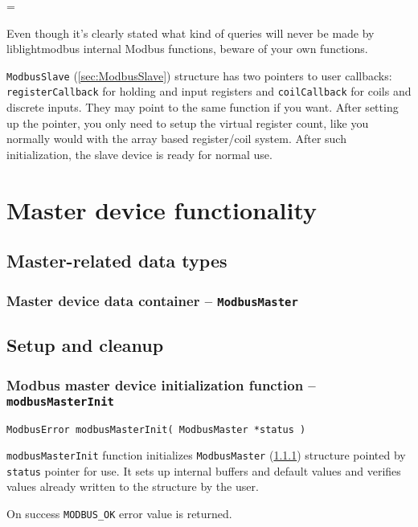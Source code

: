 \documentclass[11pt,a4paper]{article}
\newenvironment{warning}
{
	\par\begin{mdframed}[linewidth=0.5pt,linecolor=black]%
	\begin{list}{}{\leftmargin=1cm
	\labelwidth=\leftmargin}\item[\Large\ding{43}]
}
{	
	\end{list}\end{mdframed}\par
}
\newcommand{\coderef}[1]{\texttt{{#1}} (\ref{sec:#1})}
\newcommand{\warnbox}[1]{\vspace{0.2cm}\begin{warning}{#1}\end{warning}\vspace{0.2cm}}
\begin{document}
\warnbox{Even though it's clearly stated what kind of queries will never be made by liblightmodbus internal Modbus functions, beware of your own functions. }

\coderef{ModbusSlave} structure has two pointers to user callbacks: \texttt{registerCallback} for holding and input registers and \texttt{coilCallback} for coils and discrete inputs. They may point to the same function if you want. After setting up the pointer, you only need to setup the virtual register count, like you normally would with the array based register/coil system. After such initialization, the slave device is ready for normal use.






\section{Master device functionality}

\subsection{Master-related data types}
\subsubsection{Master device data container -- \texttt{ModbusMaster}} \label{sec:ModbusMaster}

\subsection{Setup and cleanup}
\subsubsection{Modbus master device initialization function -- \texttt{modbusMasterInit}}
\begin{lstlisting}[style=cproto]
ModbusError modbusMasterInit( ModbusMaster *status )
\end{lstlisting}

\texttt{modbusMasterInit} function initializes \coderef{ModbusMaster} structure pointed by \texttt{status} pointer for use. It sets up internal buffers and default values and verifies values already written to the structure by the user.\newline

On success \texttt{MODBUS\_OK} error value is returned.
\end{document}
